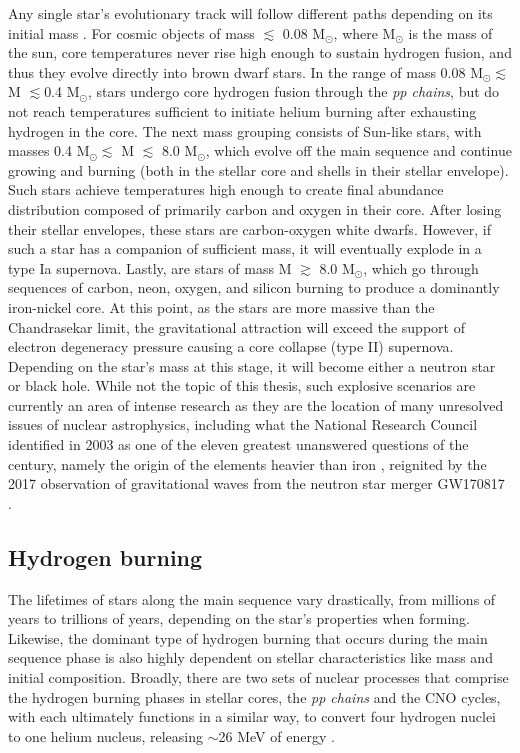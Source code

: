 Any single star's evolutionary track will follow different paths depending on its initial mass \cite{IliadisBook, RyanNortonBook}.  For cosmic objects of mass $\lesssim$ 0.08 M$_{\odot}$, where M$_{\odot}$ is the mass of the sun, core temperatures never rise high enough to sustain hydrogen fusion, and thus they evolve directly into brown dwarf stars. In the range of mass 0.08 M$_{\odot} \lesssim$ M $\lesssim$0.4 M$_{\odot}$, stars undergo core hydrogen fusion through the \textit{pp chains}, but do not reach temperatures sufficient to initiate helium burning after exhausting hydrogen in the core. The next mass grouping consists of Sun-like stars, with masses 0.4 M$_{\odot} \lesssim$ M $\lesssim$ 8.0 M$_{\odot}$, which evolve off the main sequence and continue growing and burning (both in the stellar core and shells in their stellar envelope). Such stars achieve temperatures high enough to create final abundance distribution composed of primarily carbon and oxygen in their core. After losing their stellar envelopes, these stars are carbon-oxygen white dwarfs. However, if such a star has a companion of sufficient mass, it will eventually explode in a type Ia supernova. Lastly, are stars of mass M $\gtrsim$ 8.0 M$_{\odot}$, which go through sequences of carbon, neon, oxygen, and silicon burning to produce a dominantly iron-nickel core. At this point, as the stars are more massive than the Chandrasekar limit, the gravitational attraction will exceed the support of electron degeneracy pressure causing a core collapse (type II) supernova. Depending on the star's mass at this stage, it will become either a neutron star or black hole. While not the topic of this thesis, such explosive scenarios are currently an area of intense research as they are the location of many unresolved issues of nuclear astrophysics, including what the National Research Council identified in 2003 as one of the eleven greatest unanswered questions of the century, namely the origin of the elements heavier than iron \cite{Turner2003}, reignited by the 2017 observation of gravitational waves from the neutron star merger GW170817 \cite{Abbott2017}.


\subsection{Hydrogen burning}

The lifetimes of stars along the main sequence vary drastically, from millions of years to trillions of years, depending on the star's properties when forming. Likewise, the dominant type of hydrogen burning that occurs during the main sequence phase is also highly dependent on stellar characteristics like mass and initial composition. Broadly, there are two sets of nuclear processes that comprise the hydrogen burning phases in stellar cores, the \textit{pp chains} and the CNO cycles, with each ultimately functions in a similar way, to convert four hydrogen nuclei to one helium nucleus, releasing $ \sim$26 MeV of energy \cite{RolfsBook}. 

